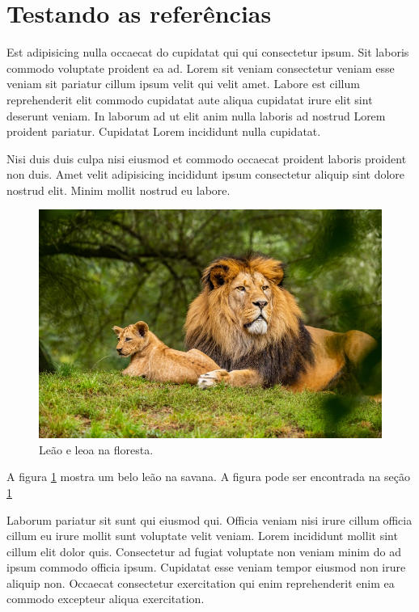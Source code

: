 \documentclass[12pt]{report}
\begin{document}

\tableofcontents

\section{Testando as referências}
\label{sec:sec1}

Est adipisicing nulla occaecat do cupidatat qui qui consectetur ipsum. Sit laboris commodo voluptate proident ea ad. Lorem sit veniam consectetur veniam esse veniam sit pariatur cillum ipsum velit qui velit amet. Labore est cillum reprehenderit elit commodo cupidatat aute aliqua cupidatat irure elit sint deserunt veniam. In laborum ad ut elit anim nulla laboris ad nostrud Lorem proident pariatur. Cupidatat Lorem incididunt nulla cupidatat. \cite{george2021}

Nisi duis duis culpa nisi eiusmod et commodo occaecat proident laboris proident non duis. Amet velit adipisicing incididunt ipsum consectetur aliquip sint dolore nostrud elit. Minim mollit nostrud eu labore.

\begin{figure}[h]
    \centering
    \includegraphics[width=0.7\linewidth]{img/lion}
    \caption[Leão e leoa]{Leão e leoa na floresta.}
    \label{fig:lion}
\end{figure}

A figura \ref{fig:lion} mostra um belo leão na savana. A figura pode ser encontrada na seção \ref{sec:sec1}

Laborum pariatur sit sunt qui eiusmod qui. Officia veniam nisi irure cillum officia cillum eu irure mollit sunt voluptate velit veniam. Lorem incididunt mollit sint cillum elit dolor quis. Consectetur ad fugiat voluptate non veniam minim do ad ipsum commodo officia ipsum. Cupidatat esse veniam tempor eiusmod non irure aliquip non. Occaecat consectetur exercitation qui enim reprehenderit enim ea commodo excepteur aliqua exercitation.


\nocite{assis2019} %

\newpage


\end{document}
